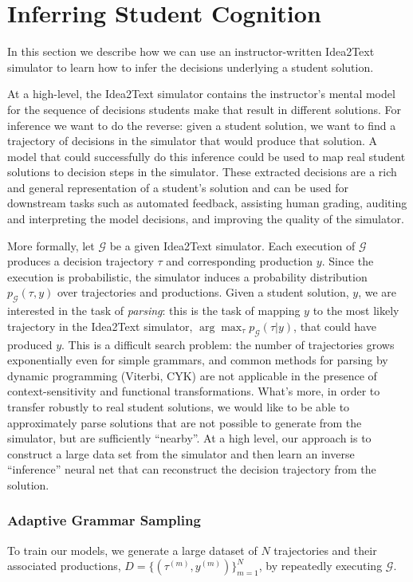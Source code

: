 \section{Inferring Student Cognition} 
\label{sec:inference}
\label{sec:models}

In this section we describe how we can use an instructor-written Idea2Text simulator to learn how to infer the decisions underlying a student solution. 

At a high-level, the Idea2Text simulator contains the instructor's mental model for the sequence of decisions students make that result in different solutions. For inference we want to do the reverse: given a student solution, we want to find a trajectory of decisions in the simulator that would produce that solution.
A model that could successfully do this inference could be used to map real student solutions to decision steps in the simulator. These extracted decisions are a rich and general representation of a  student’s  solution  and  can  be  used  for  downstream  tasks  such as   automated  feedback,  assisting human grading, auditing and interpreting the model decisions, and improving the quality of the simulator.


More formally, let $\mathcal{G}$ be a given Idea2Text simulator. Each execution of $\mathcal{G}$ produces a decision trajectory $\tau$ and corresponding production $y$. Since the execution is probabilistic, the simulator induces a probability distribution $p_\mathcal{G}(\tau, y)$ over trajectories and productions.
Given a student solution, $y$, we are interested in the task of \textit{parsing}: this is the task of mapping $y$ to the most likely trajectory in the Idea2Text simulator, $\arg\max_{\tau} p_\mathcal{G}(\tau | y)$, that could have produced $y$. 
This is a difficult search problem: the number of trajectories grows exponentially even for simple grammars, and common methods for parsing by dynamic programming (Viterbi, CYK) are not applicable in the presence of context-sensitivity and functional transformations.
What's more, in order to transfer robustly to real student solutions, we would like to be able to approximately parse solutions that are not possible to generate from the simulator, but are sufficiently ``nearby''. 
At a high level, our approach is to construct a large data set from the simulator and then learn an inverse ``inference'' neural net that can reconstruct the decision trajectory from the solution.

\subsubsection{Adaptive Grammar Sampling}
To train our models, we generate a large dataset of $N$ trajectories and their associated productions, $D = \{ (\tau^{(m)}, y^{(m)}) \}_{m=1}^N$, by repeatedly executing $\mathcal{G}$. 

